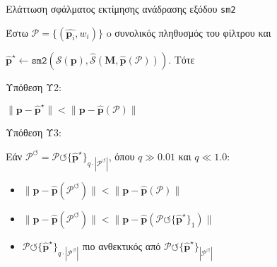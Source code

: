 \begin{frame}[fragile]{Ελάττωση σφάλματος εκτίμησης ανάδρασης εξόδου \texttt{sm2}}

  Έστω $\mathcal{P} = \{(\hat{\bm{p}_i}, w_i)\}$ o συνολικός πληθυσμός του φίλτρου και

  $\hat{\bm{p}}^\star \leftarrow \texttt{sm2}(\mathcal{S}(\bm{p}), \hat{\mathcal{S}}(\bm{M}, \hat{\bm{p}}(\mathcal{P})))$. Τότε \vspace{0.3cm}

  Υπόθεση Υ2: \vspace{-0.6cm}
  \begin{bw_box}
    $\|\bm{p} - \hat{\bm{p}}^\star\| < \|\bm{p} - \hat{\bm{p}}(\mathcal{P})\|$
  \end{bw_box} \vspace{0.4cm}

  Υπόθεση Υ3: \vspace{-0.6cm}
  \begin{bw_box}

    Εάν $\mathcal{P}^\circlearrowleft = \mathcal{P} \circlearrowleft \{\hat{\bm{p}}^\star\}_{q \cdot |\mathcal{P}^\circlearrowleft|}$,
    όπου $q \gg 0.01$ και $q \ll 1.0$:

    \begin{itemize}
      \item $\|\bm{p} - \hat{\bm{p}}(\mathcal{P}^\circlearrowleft)\|                          < \|\bm{p} - \hat{\bm{p}}(\mathcal{P})\| $
      \item $\|\bm{p} - \hat{\bm{p}}(\mathcal{P}^\circlearrowleft)\| < \|\bm{p} - \hat{\bm{p}}(\mathcal{P} \circlearrowleft \{\hat{\bm{p}}^\star\}_1)\|$
      \item $\mathcal{P} \circlearrowleft \{\hat{\bm{p}}^\star\}_{q \cdot |\mathcal{P}^\circlearrowleft|}$ πιο ανθεκτικός από $\mathcal{P} \circlearrowleft \{\hat{\bm{p}}^\star\}_{|\mathcal{P}^\circlearrowleft|}$
    \end{itemize}

  \end{bw_box}

\end{frame}
